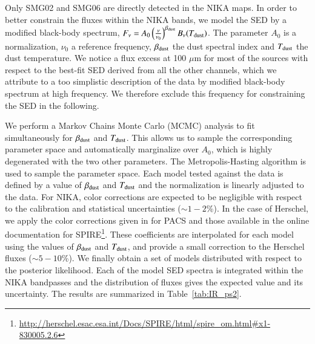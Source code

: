 \documentclass[twocolumn,traditabstract]{aa}
\begin{document}
Only SMG02 and SMG06 are directly detected in the NIKA maps. In order to better constrain the fluxes within the NIKA bands, we model the SED by a modified black-body spectrum, $F_{\nu} = A_0 \left(\frac{\nu}{\nu_0}\right)^{\beta_{\rm dust}} B_{\nu}(T_{\rm dust})$. The parameter $A_0$ is a normalization, $\nu_0$ a reference frequency, $\beta_{\rm dust}$ the dust spectral index and $T_{\rm dust}$ the dust temperature. We notice a flux excess at 100 $\mu$m for most of the sources with respect to the best-fit SED derived from all the other channels, which we attribute to a too simplistic description of the data by modified black-body spectrum at high frequency. We therefore exclude this frequency for constraining the SED in the following. 

We perform a Markov Chains Monte Carlo (MCMC) analysis to fit simultaneously for $\beta_{\rm dust}$ and $T_{\rm dust}$. This allows us to sample the corresponding parameter space and automatically marginalize over $A_0$, which is highly degenerated with the two other parameters. The Metropolis-Hasting algorithm is used to sample the parameter space. Each model tested against the data is defined by a value of $\beta_{\rm dust}$ and $T_{\rm dust}$ and the normalization is linearly adjusted to the data. For NIKA, color corrections are expected to be negligible with respect to the calibration and statistical uncertainties ($\sim 1-2$\%). In the case of Herschel, we apply the color corrections given in \cite{poglitsch2010} for PACS and those available in the online documentation for SPIRE\footnote{\url{http://herschel.esac.esa.int/Docs/SPIRE/html/spire_om.html\#x1-830005.2.6}}. These coefficients are interpolated for each model using the values of $\beta_{\rm dust}$ and $T_{\rm dust}$, and provide a small correction to the Herschel fluxes ($\sim 5-10$\%). We finally obtain a set of models distributed with respect to the posterior likelihood. Each of the model SED spectra is integrated within the NIKA bandpasses and the distribution of fluxes gives the expected value and its uncertainty. The results are summarized in Table~\ref{tab:IR_ps2}.

\end{document}
